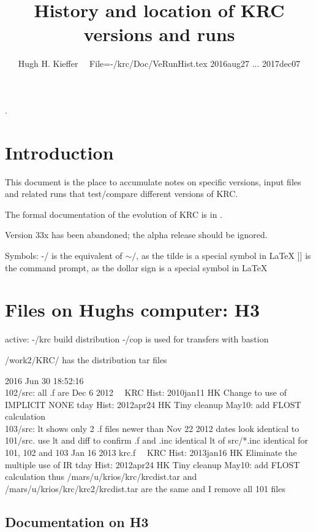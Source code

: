 \documentclass{article}
\title{History and location of KRC versions and runs}
\author{Hugh H. Kieffer  \ \ File=-/krc/Doc/VeRunHist.tex 2016aug27 ... 2017dec07}
\begin{document}
\maketitle
\tableofcontents
\hrulefill .\hrulefill

\section{Introduction}

This document is the place to accumulate notes on specific versions, input files
and related runs that test/compare different versions of KRC.

The formal documentation of the evolution of KRC is in  .

Version 33x has been abandoned; the alpha release should be ignored.

Symbols: 
\qi -/ is the equivalent of $\sim /$, as the tilde is a special symbol in LaTeX
\qi ]] is the command prompt, as the dollar sign is a special symbol in LaTeX

\section{Files on Hughs computer: H3}
active: -/krc
build distribution
-/cop is used for transfers with bastion

/work2/KRC/ has the distribution tar files

2016 Jun 30 18:52:16
\\ 102/src:  all .f are Dec  6  2012 \ \  KRC Hist: 2010jan11 HK Change to use of IMPLICIT NONE
\qi tday Hist:  2012apr24  HK  Tiny cleanup  May10: add FLOST calculation
\\ 103/src: lt shows only 2 .f files newer than Nov 22  2012
\qii dates look identical to 101/src. use lt and diff to confirm .f and .inc identical
\qii lt of src/*.inc identical for 101, 102 and 103
 Jan 16  2013 krc.f \ \  KRC Hist: 2013jan16 HK Eliminate the multiple use of IR 
\qi tday Hist:  2012apr24  HK  Tiny cleanup  May10: add FLOST calculation
\qi thus /mars/u/krios/krc/krcdist.tar and /mars/u/krios/krc/krc2/krcdist.tar are the same
\qi and I remove all 101 files

\subsection{Documentation on H3}
\end{document}
